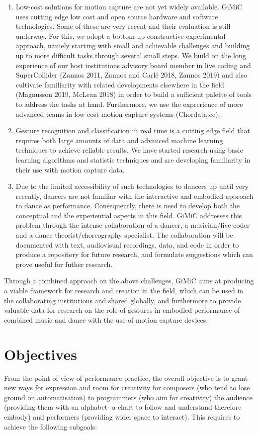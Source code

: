 \begin{enumerate}
\item Low-cost solutions for motion capture are not yet widely available. GiMiC uses cutting edge low cost and open source hardware and software technologies.  Some of these are very recent and their evaluation is still underway.  For this, we adopt a bottom-up constructive experimental approach, namely starting with small and achievable challenges and building up to more difficult tasks through several small steps.  We build on the long experience of our host institutions advisory board member in live coding and SuperCollider (Zannos 2011, Zannos and Carlé 2018, Zannos 2019) and also cultivate familiarity with related developments elsewhere in the field (Magnusson 2019, McLean 2018) in order to build a sufficient palette of tools to address the tasks at hand.  Furthermore, we use the exprerience of more advanced teams in low cost motion capture systems (Chordata.cc).
\item Gesture recognition and classification in real time is a cutting edge field that requires both large amounts of data and advanced machine learning techniques to achieve reliable results.  We have started research using basic learning algorithms and statistic techniques and are developing familiarity in their use with motion capture data.
\item Due to the limited accessibility of such technologies to dancers up until very recently, dancers are not familiar with the interactive and embodied approach to dance as performance.  Consequently, there is need to develop both the conceptual and the experiential aspects in this field.  GiMiC addresses this problem through the intense collaboration of a dancer, a musician/live-coder and a dance theorist/choreography specialist.  The collaboration will be documented with text, audiovisual recordings, data, and code in order to produce a repository for future research, and formulate suggestions which can prove useful for futher research.
\end{enumerate}

Through a combined approach on the above challenges, GiMiC aims at producing a viable framework for research and creation in the field, which can be used in the collaborating institutions and shared globally, and furthermore to provide valuable data for research on the role of gestures in embodied performance of combined music and dance with the use of motion capture devices.

\section{Objectives}
\label{sec:org9dc3b25}
From the point of view of performance practice, the overall objective is to grant new ways for expression and room for creativity for composers (who tend to lose ground on automatisation) to programmers (who aim for creativity) the audience (providing them with an alphabet- a chart to follow and understand therefore embody) and performers (providing wider space to interact).  This requires to achieve the following subgoals:


